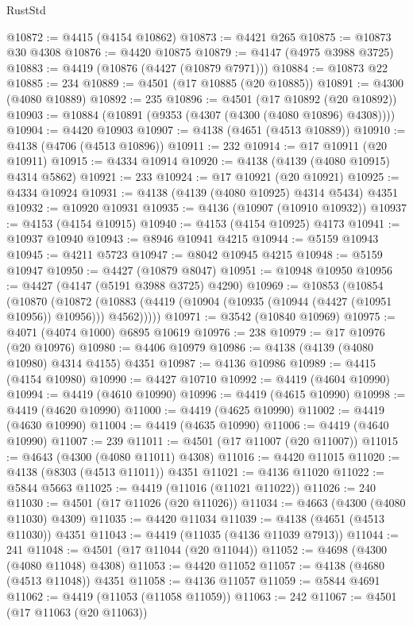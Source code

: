 \begin{lexlean}{RustStd}
\begin{coremodule}
@10872 := @4415 (@4154 @10862)
@10873 := @4421 @265
@10875 := @10873 @30 @4308
@10876 := @4420 @10875
@10879 := @4147 (@4975 @3988 @3725)
@10883 := @4419 (@10876 (@4427 (@10879 @7971)))
@10884 := @10873 @22
@10885 := 234
@10889 := @4501 (@17 @10885 (@20 @10885))
@10891 := @4300 (@4080 @10889)
@10892 := 235
@10896 := @4501 (@17 @10892 (@20 @10892))
@10903 := @10884 (@10891 (@9353 (@4307 (@4300 (@4080 @10896) @4308))))
@10904 := @4420 @10903
@10907 := @4138 (@4651 (@4513 @10889))
@10910 := @4138 (@4706 (@4513 @10896))
@10911 := 232
@10914 := @17 @10911 (@20 @10911)
@10915 := @4334 @10914
@10920 := @4138 (@4139 (@4080 @10915) @4314 @5862)
@10921 := 233
@10924 := @17 @10921 (@20 @10921)
@10925 := @4334 @10924
@10931 := @4138 (@4139 (@4080 @10925) @4314 @5434) @4351
@10932 := @10920 @10931
@10935 := @4136 (@10907 (@10910 @10932))
@10937 := @4153 (@4154 @10915)
@10940 := @4153 (@4154 @10925) @4173
@10941 := @10937 @10940
@10943 := @8946 @10941 @4215
@10944 := @5159 @10943
@10945 := @4211 @5723
@10947 := @8042 @10945 @4215
@10948 := @5159 @10947
@10950 := @4427 (@10879 @8047)
@10951 := @10948 @10950
@10956 := @4427 (@4147 (@5191 @3988 @3725) @4290)
@10969 := @10853
    (@10854
      (@10870
        (@10872 (@10883 (@4419 (@10904 (@10935 (@10944 (@4427 (@10951 @10956)) @10956))) @4562)))))
@10971 := @3542 (@10840 @10969)
@10975 := @4071 (@4074 @1000) @6895 @10619
@10976 := 238
@10979 := @17 @10976 (@20 @10976)
@10980 := @4406 @10979
@10986 := @4138 (@4139 (@4080 @10980) @4314 @4155) @4351
@10987 := @4136 @10986
@10989 := @4415 (@4154 @10980)
@10990 := @4427 @10710
@10992 := @4419 (@4604 @10990)
@10994 := @4419 (@4610 @10990)
@10996 := @4419 (@4615 @10990)
@10998 := @4419 (@4620 @10990)
@11000 := @4419 (@4625 @10990)
@11002 := @4419 (@4630 @10990)
@11004 := @4419 (@4635 @10990)
@11006 := @4419 (@4640 @10990)
@11007 := 239
@11011 := @4501 (@17 @11007 (@20 @11007))
@11015 := @4643 (@4300 (@4080 @11011) @4308)
@11016 := @4420 @11015
@11020 := @4138 (@8303 (@4513 @11011)) @4351
@11021 := @4136 @11020
@11022 := @5844 @5663
@11025 := @4419 (@11016 (@11021 @11022))
@11026 := 240
@11030 := @4501 (@17 @11026 (@20 @11026))
@11034 := @4663 (@4300 (@4080 @11030) @4309)
@11035 := @4420 @11034
@11039 := @4138 (@4651 (@4513 @11030)) @4351
@11043 := @4419 (@11035 (@4136 @11039 @7913))
@11044 := 241
@11048 := @4501 (@17 @11044 (@20 @11044))
@11052 := @4698 (@4300 (@4080 @11048) @4308)
@11053 := @4420 @11052
@11057 := @4138 (@4680 (@4513 @11048)) @4351
@11058 := @4136 @11057
@11059 := @5844 @4691
@11062 := @4419 (@11053 (@11058 @11059))
@11063 := 242
@11067 := @4501 (@17 @11063 (@20 @11063))

\end{coremodule}
\end{lexlean}

